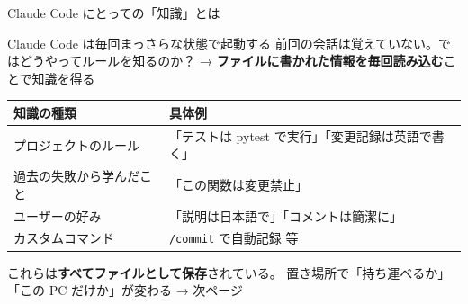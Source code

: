 \documentclass[aspectratio=169, 14pt]{beamer}
\begin{document}
\begin{frame}{Claude Code にとっての「知識」とは}
  \begin{block}{Claude Code は毎回まっさらな状態で起動する}
    {\small
    前回の会話は覚えていない。ではどうやってルールを知るのか？
    → \textbf{ファイルに書かれた情報を毎回読み込む}ことで知識を得る}
  \end{block}

  \vspace{0.2em}

  \begin{table}
    \centering\footnotesize
    \begin{tabular}{lp{75mm}}
      \hline
      \textbf{知識の種類} & \textbf{具体例} \\
      \hline
      プロジェクトのルール &
        「テストは pytest で実行」「変更記録は英語で書く」 \\
      過去の失敗から学んだこと &
        「この関数は変更禁止」 \\
      ユーザーの好み &
        「説明は日本語で」「コメントは簡潔に」 \\
      カスタムコマンド &
        \texttt{/commit} で自動記録 等 \\
      \hline
    \end{tabular}
  \end{table}

  \vspace{0.2em}

  {\footnotesize
    これらは\textbf{すべてファイルとして保存}されている。
    置き場所で「持ち運べるか」「この PC だけか」が変わる → 次ページ}
\end{frame}
\end{document}

